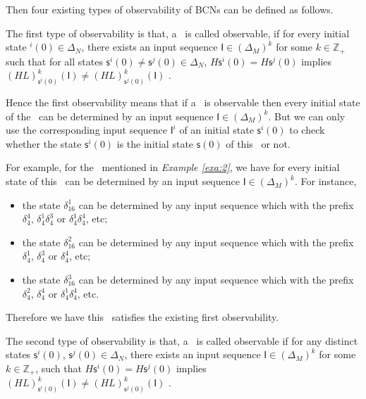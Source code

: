 Then four existing types of observability of BCNs can be defined as follows.
\begin{definition} 
The first type of observability is that, a \BCN\ is called observable, if for every initial state \State$^{i}(0)$$\in \Delta_N$, there exists an input sequence $\mathsf{I}\in(\Delta_M)^k$ for some $k\in \mathbb{Z}_+$ such that for all states $\mathsf{s}^{i}(0)\neq \mathsf{s}^{j}(0)\in \Delta_N$, $H\mathsf{s}^{i}(0)=H\mathsf{s}^{j}(0)$ implies $(HL)^k_{\mathsf{s}^{i}(0)}(\mathsf{I})\neq (HL)^k_{{\mathsf{s}^{j}(0)}}(\mathsf{I})$ \cite{cheng2009controllability}.
\end{definition}

Hence the first observability means that if a \BCN\ is observable then every initial state of the \BCN\ can be determined by an input sequence $\mathsf{I}\in(\Delta_M)^k$. But we can only use the corresponding input sequence $\mathsf{I}^i$ of an initial state $\mathsf{s}^{i}(0)$ to check whether the state $\mathsf{s}^{i}(0)$ is the initial state $\mathsf{s}(0)$ of this \BCN\ or not.
\begin{example}
For example, for the \BCN\ mentioned in {\em Example \ref{exa:2}}, we have for every initial state of this \BCN\ can be determined by an input sequence $\mathsf{I}\in(\Delta_M)^k$.  For instance,
\begin{itemize}
  \item the state $\delta_{16}^1$ can be determined by any input sequence which with the prefix $\delta_{4}^4$, $\delta_{4}^1 \delta_{4}^3$ or $\delta_{4}^1 \delta_{4}^4$, etc;
  \item the state $\delta_{16}^2$ can be determined by any input sequence which with the prefix $\delta_{4}^1$, $\delta_{4}^3$ or $\delta_{4}^4$, etc;
  \item the state $\delta_{16}^3$ can be determined by any input sequence which with the prefix $\delta_{4}^2$, $\delta_{4}^4$ or $\delta_{4}^1 \delta_{4}^4$, etc.
\end{itemize} 

Therefore we have this \BCN\ satisfies the existing first observability.
\label{exa:4}
\end{example}   

\begin{definition}
	The second type of observability is that, a \BCN\ is called observable if for any distinct states $\mathsf{s}^{i}(0)$, $\mathsf{s}^{j}(0) \in \Delta_N$, there exists an input sequence $\mathsf{I}\in(\Delta_M)^k$ for some $k\in \mathbb{Z}_+$, such that $H\mathsf{s}^{i}(0)=H\mathsf{s}^{j}(0)$ implies $(HL)^k_{\mathsf{s}^{i}(0)}(\mathsf{I})\neq (HL)^k_{\mathsf{s}^{j}(0)}(\mathsf{I})$ \cite{Zhao2010Input}.
\end{definition}

